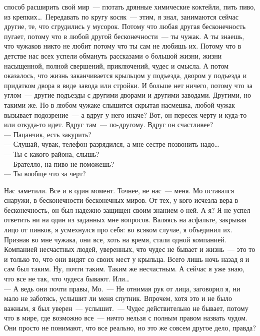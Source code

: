 способ расширить свой мир~--- глотать дрянные химические коктейли, пить пиво, 
из крепких\ldots\ Передавать по кругу косяк~--- этим, я знал, занимаются сейчас 
другие, те, что сгрудились у мусорок. Потому что любая другая бесконечность пугает, потому 
что в любой другой бесконечности~--- ты чужак. А ты знаешь, что чужаков никто 
не любит потому что ты сам не любишь их. Потому что в детстве нас всех успели 
обмануть рассказами о большой жизни, жизни насыщенной, полной свершений, 
приключений, чудес и смысла. А потом оказалось, что жизнь заканчивается 
крыльцом у подъезда, двором у подъезда и придатком двора в виде завода или стройки. И 
больше нет ничего, потому что за углом~--- другие подъезды с другими дворами и 
другими заводами. Другими, но такими же. Но в любом чужаке слышится скрытая 
насмешка, любой чужак вызывает подозрение~--- а вдруг у него иначе? Вот, он 
пересек черту и куда-то или откуда-то идет. Вдруг там~--- по-другому. Вдруг он 
счастливее?\\
--- Пацанчик, есть закурить?\\
--- Слушай, чувак, телефон разрядился, а мне сестре позвонить надо\ldots\\
--- Ты с какого района, слышь?\\
--- Брателло, на пиво не поможешь?\\
--- Ты вообще что за черт?

Нас заметили. Все и в один момент. Точнее, не нас~--- меня. Мо оставался 
снаружи, в бесконечности бесконечных миров. От тех, у кого исчезла вера в бесконечность, 
он был надежно защищен своим знанием о ней. А я? Я не успел ответить ни на один 
из заданных мне вопросов. Валяясь на асфальте, закрывая лицо от пинков, я 
усмехнулся про себя: во всяком случае, я объединил их. Признав во мне чужака, 
они все, хоть на время, стали одной компанией. Компанией несчастных людей, 
уверенных, что чудес не бывает и жизнь~--- это то и только то, что они видят со 
своих мест у крыльца. Всего лишь ночь назад я и сам был таким. Ну, почти таким. 
Таким же несчастным. А сейчас я уже знаю, что все не так, что чудеса бывают. 
Или\ldots\\
--- А ведь они почти правы, Мо.~--- Не отнимая рук от лица, заговорил я, ни мало 
не заботясь, услышит ли меня спутник. Впрочем, хотя это и не было важным, я был 
уверен~--- услышит.~--- Чудес действительно не бывает, потому что в мире, где 
возможно все~--- ничто нельзя с полным правом назвать чудом. Они просто не 
понимают, что все реально, но это же совсем другое дело, правда?

